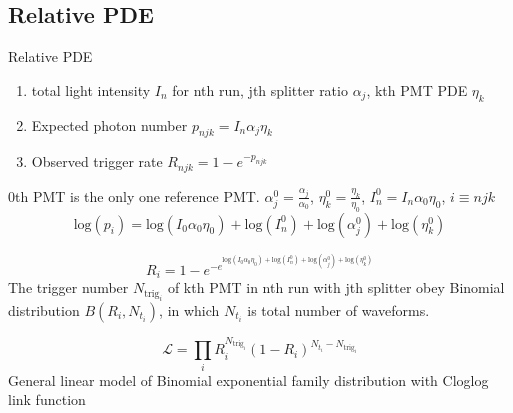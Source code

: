 \documentclass[aspectratio=169]{beamer}
\begin{document}
\subsection{Relative PDE}
\begin{frame}{Relative PDE}
    \begin{enumerate}
        \item total light intensity  $I_n$ for nth run, jth splitter ratio $\alpha_j$, kth PMT PDE $\eta_k$
        \item Expected photon number $p_{njk}=I_n\alpha_j\eta_k$
        \item Observed trigger rate $R_{njk}=1-e^{-p_{njk}}$
    \end{enumerate}
    0th PMT is the only one reference PMT. $\alpha_j^0=\frac{\alpha_j}{\alpha_0}$, $\eta_k^0=\frac{\eta_k}{\eta_0}$, $I_n^0=I_n\alpha_0\eta_0$, $i\equiv njk$
    \begin{equation}
        \label{equ:pdelograte}
        \mathrm{log}(p_{i})=\mathrm{log}(I_0\alpha_0\eta_0)+\mathrm{log}(I_n^0)+\mathrm{log}(\alpha_j^0)+\mathrm{log}(\eta_k^0)
    \end{equation}

    \begin{equation}
        \label{equ:linkfunction}
        R_{i}=1-e^{-e^{\mathrm{log}(I_0\alpha_0\eta_0)+\mathrm{log}(I_n^0)+\mathrm{log}(\alpha_j^0)+\mathrm{log}(\eta_k^0)}}
    \end{equation}
    The trigger number $N_{{\mathrm{trig}_{i}}}$ of kth PMT in nth run with jth splitter obey Binomial distribution $B(R_{i},N_{t_{i}})$, in which $N_{t_{i}}$ is total number of waveforms.

    \begin{equation}
        \label{equ:likelihood}
        \mathcal{L}=\prod_{i}{R_{i}^{N_{\mathrm{trig}_{i}}}(1-R_{i})^{N_{t_{i}}-N_{\mathrm{trig}_{i}}}}
    \end{equation}
General linear model of Binomial exponential family distribution with Cloglog link function
\end{frame}
\end{document}
